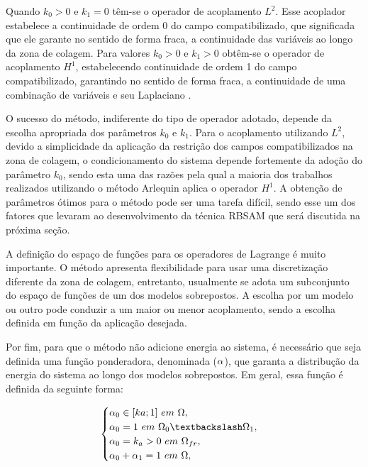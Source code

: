 Quando $k_{0} > 0$ e $k_{1} = 0 $ têm-se o operador de acoplamento $L^{2}$. Esse acoplador estabelece a continuidade de ordem 0 do campo compatibilizado, que significada que ele garante no sentido de forma fraca, a continuidade das variáveis ao longo da zona de colagem. Para valores $k_{0} > 0$ e $k_{1} > 0 $ obtêm-se o operador de acoplamento $H^{1}$, estabelecendo continuidade de ordem 1 do campo compatibilizado, garantindo no sentido de forma fraca, a continuidade de uma combinação de variáveis e seu Laplaciano \cite{GuidaultAndBelytschko2007}.

O sucesso do método, indiferente do tipo de operador adotado, depende da escolha apropriada dos parâmetros $k_{0}$ e $k_{1}$. Para o acoplamento utilizando $L^{2}$, devido a simplicidade da aplicação da restrição dos campos compatibilizados na zona de colagem, o condicionamento do sistema depende fortemente da adoção do parâmetro $k_{0}$, sendo esta uma das razões pela qual a maioria dos trabalhos realizados utilizando o método Arlequin aplica o operador $H^{1}$. A obtenção de parâmetros ótimos para o método pode ser uma tarefa difícil, sendo esse um dos fatores que levaram  ao desenvolvimento da técnica RBSAM que será discutida na próxima seção.

A definição do espaço de funções para os operadores de Lagrange é muito importante. O método apresenta flexibilidade para usar uma discretização diferente da zona de colagem, entretanto, usualmente se adota um subconjunto do espaço de funções de um dos modelos sobrepostos. A escolha por um modelo ou outro pode conduzir a um maior ou menor acoplamento, sendo a escolha definida em função da aplicação desejada. 

Por fim, para que o método não adicione energia ao sistema, é necessário que seja definida uma função ponderadora, denominada ($\alpha$), que garanta a distribução da energia do sistema ao longo dos modelos sobrepostos. Em geral, essa função é definida da seguinte forma:

\begin{align}
	\begin{cases} \arlequinWFGlobal \in [ka;1] \ em \ \domain, \\ 
	\arlequinWFGlobal = 1 \ em \ \globalModel \textbackslash \localModel,  \\
	\arlequinWFGlobal  = k_a > 0 \ em \ \freeZone, \\
	\arlequinWFGlobal + \arlequinWFLocal = 1 \ em \ \domain,
	\end{cases} \label{eq:funcPondeArleq}
\end{align}

